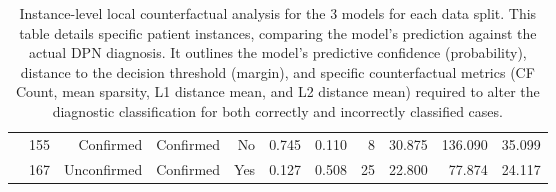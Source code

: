 \documentclass[fleqn,10pt]{wlscirep}
\begin{document}
\begin{table}[h]
\begin{tabular}{lrrrrrrrrrr}
 & 155 & Confirmed & Confirmed & No & 0.745 & 0.110 & 8 & 30.875 & 136.090 & 35.099 \\
 & 167 & Unconfirmed & Confirmed & Yes & 0.127 & 0.508 & 25 & 22.800 & 77.874 & 24.117 \\
\bottomrule
\end{tabular}
\caption{Instance-level local counterfactual analysis for the 3 models for each data split. This table details specific patient instances, comparing the model's prediction against the actual DPN diagnosis. It outlines the model's predictive confidence (probability), distance to the decision threshold (margin), and specific counterfactual metrics (CF Count, mean sparsity, L1 distance mean, and L2 distance mean) required to alter the diagnostic classification for both correctly and incorrectly classified cases.}
\label{tab:localcf-listing}
\end{table}
\end{document}
